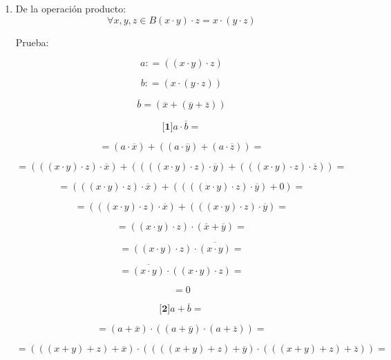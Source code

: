 \documentclass[
]{article}
\begin{document}
\begin{enumerate}
\begin{enumerate}
\begin{enumerate}
\begin{enumerate}
        \[{= {\overline{({x\cdot y})} \cdot {({{({x \cdot y})} \cdot z})}}} =\]

        \[= 0\]

        \[\mathit{De}{\lbrack\mathbf{1}\rbrack}y\mathit{de}{\lbrack\mathbf{2}\rbrack}\mathit{obtenemos}\mathit{que}{\overline{a} = \overline{b}}\Rightarrow{a = b}\]
      \item
        De la operación producto:
        \[\forall x,y,{z \in B}{{{({x \cdot y})} \cdot z} = {x \cdot {({y \cdot z})}}}\]

        Prueba:

        \[a{: = {({{({x \cdot y})} \cdot z})}}\]

        \[b{: = {({x \cdot {({y \cdot z})}})}}\]

        \[\overline{b}{= {({\overline{x} + {({\overline{y} + \overline{z}})}})}}\]

        \[{\lbrack\mathbf{1}\rbrack}{{a \cdot \overline{b}} =}\]

        \[{= {{({a \cdot \overline{x}})} + {({{({a \cdot \overline{y}})} + {({a \cdot \overline{z}})}})}}} =\]

        \[{= {{({{({{({x \cdot y})} \cdot z})} \cdot \overline{x}})} + {({{({{({{({x \cdot y})} \cdot z})} \cdot \overline{y}})} + {({{({{({x \cdot y})} \cdot z})} \cdot \overline{z}})}})}}} =\]

        \[{= {{({{({{({x \cdot y})} \cdot z})} \cdot \overline{x}})} + {({{({{({{({x \cdot y})} \cdot z})} \cdot \overline{y}})} + 0})}}} =\]

        \[{= {{({{({{({x \cdot y})} \cdot z})} \cdot \overline{x}})} + {({{({{({x \cdot y})} \cdot z})} \cdot \overline{y}})}}} =\]

        \[{= {{({{({x \cdot y})} \cdot z})} \cdot {({\overline{x} + \overline{y}})}}} =\]

        \[{= {{({{({x \cdot y})} \cdot z})} \cdot \overline{({x\cdot y})}}} =\]

        \[{= {\overline{({x\cdot y})} \cdot {({{({x \cdot y})} \cdot z})}}} =\]

        \[= 0\]

        \[{\lbrack\mathbf{2}\rbrack}{{a + \overline{b}} =}\]

        \[{= {{({a + \overline{x}})} \cdot {({{({a + \overline{y}})} \cdot {({a + \overline{z}})}})}}} =\]

        \[{= {{({{({{({x + y})} + z})} + \overline{x}})} \cdot {({{({{({{({x + y})} + z})} + \overline{y}})} \cdot {({{({{({x + y})} + z})} + \overline{z}})}})}}} =\]


\end{enumerate}
\end{enumerate}
\end{enumerate}
\end{enumerate}
\end{document}
